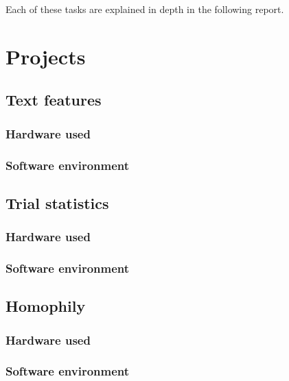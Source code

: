 \documentclass{report}
\begin{document}
Each of these tasks are explained in depth in the following report.


\chapter{Projects}
\section{Text features}

\subsection{Hardware used}

\subsection{Software environment}


\section{Trial statistics}

\subsection{Hardware used}

\subsection{Software environment}


\section{Homophily}

\subsection{Hardware used}

\subsection{Software environment}
\end{document}
